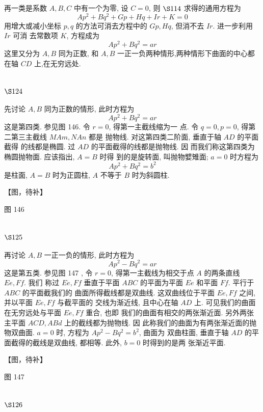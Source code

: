 再一类是系数 $A, B, C$ 中有一个为零, 设 $C=0$, 则 $\S 114$ 求得的通用方程为
\[
A p^{2}+B q^{2}+G p+H q+I r+K=0
\]
用增大或减小坐标 $p, q$ 的方法可消去方程中的 $G p, H q$, 但消不去 $I r$. 进一步利用 $I r$ 可消 去常数项 $K$, 方程成为
\[
A p^{2}+B q^{2}=a r
\]
这里又分为 $A, B$ 同为正数, 和 $A, B$ 一正一负两种情形,两种情形下曲面的中心都在轴 $C D$ 上,在无穷远处. 

\section{$\S 124$}

先讨论 $A, B$ 同为正数的情形, 此时方程为
\[
A p^{2}+B q^{2}=a r
\]
这是第四类. 参见图 146. 令 $r=0$, 得第一主截线缩为一 点. 令 $q=0, p=0$, 得第二第三主截线 $M A m, N A n$ 都是 抛物线. 对这第四类二阶面, 垂直于轴 $A D$ 的平面截得 的线都是椭圆. 过 $A D$ 的平面截得的线都是抛物线. 因 而我们称这第四类为椭圆抛物面. 应该指出, $A=B$ 时得 到的是旋转面, 叫抛物嬖雉面; $a=0$ 时方程为
\[
A p^{2}+B q^{2}=b^{2}
\]
是柱面, $A=B$ 时为正圆柱, $A$ 不等于 $B$ 时为斜圆柱.


【图，待补】

图 146

\section{$\S 125$}

再讨论 $A, B$ 一正一负的情形, 此时方程为
\[
A p^{2}-B q^{2}=a r
\]
这是第五类. 参见图 147 , 令 $r=0$, 得第一主截线为相交于点 $A$ 的两条直线 $E e, F f$. 我们 称过 $E e, F f$ 垂直于平面 $A B C$ 的平面为平面 $E e$ 和平面 $F f$. 平行于 $A B C$ 的平面截我们的 曲面所得截线都是双曲线. 这双曲线位于平面 $E e, F f$ 之间, 并以平面 $E e, F f$ 与截平面的 交线为渐近线, 且中心在轴 $A D$ 上. 可见我们的曲面在无穷远处与平面 $E e, F f$ 重合, 也即 我们的曲面有相交的两张渐近面. 另外两张主平面 $A C D, A B d$ 上的截线都为抛物线. 因 此称我们的曲面为有两张渐近面的抛物双曲面. $a=0$ 时, 方程为 $A p^{2}-B q^{2}=b^{2}$, 曲面为 双曲柱面, 垂直于轴 $A D$ 的平面截得的截线是双曲线, 都相等. 此外, $b=0$ 时得到的是两 张渐近平面.


【图，待补】

图 147 

\section{$\S 126$}

